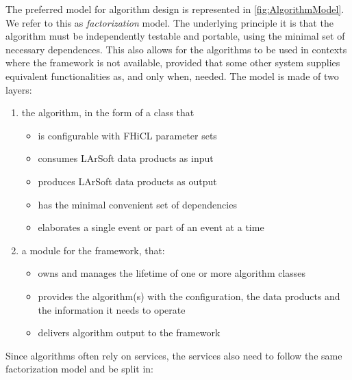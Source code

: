 The preferred model for algorithm design is represented in \cref{fig:AlgorithmModel}.
We refer to this as \emph{factorization} model.
The underlying principle it is that the algorithm must be independently
testable and portable, using the minimal set of necessary dependences.
This also allows for the algorithms to be used in contexts where the
\ART framework is not available,
provided that some other system supplies equivalent functionalities as,
and only when, needed. The model is made of two layers:
\begin{enumerate}
   \item
      the algorithm, in the form of a class that
      \begin{itemize}
         \item
            is configurable with FHiCL parameter sets
         \item
            consumes LArSoft data products as input
         \item
            produces LArSoft data products as output
         \item
            has the minimal convenient set of dependencies
         \item
            elaborates a single event or part of an event at a time
      \end{itemize}
   \item
      a module for the \ART framework, that:
      \begin{itemize}
         \item
           owns and manages the lifetime of one or more algorithm classes
         \item
           provides the algorithm(s) with the configuration, the data products
           and the information it needs to operate
         \item
           delivers algorithm output to the \ART framework
      \end{itemize}
\end{enumerate}

Since algorithms often rely on services, the services also need to
follow the same factorization model and be split in:

